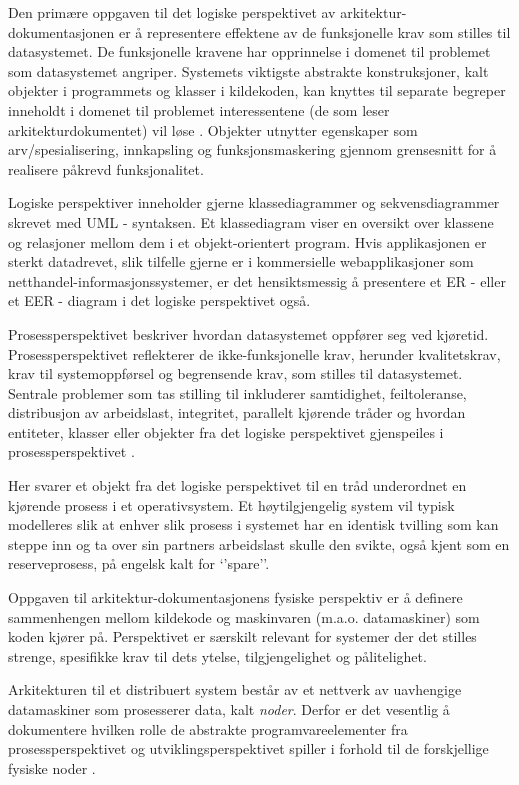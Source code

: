 Den primære oppgaven til det logiske perspektivet av arkitektur-dokumentasjonen er å representere effektene av de funksjonelle krav som stilles til datasystemet. De funksjonelle kravene har opprinnelse i domenet til problemet som datasystemet angriper. Systemets viktigste abstrakte konstruksjoner, kalt objekter i programmets og klasser i kildekoden, kan knyttes til separate begreper inneholdt i domenet til problemet interessentene (de som leser arkitekturdokumentet) vil løse \citep{kruchten1995}. Objekter utnytter egenskaper som arv/spesialisering, innkapsling og funksjonsmaskering gjennom grensesnitt for å realisere påkrevd funksjonalitet.

Logiske perspektiver inneholder gjerne klassediagrammer og sekvensdiagrammer skrevet med UML - syntaksen. Et klassediagram viser en oversikt over klassene og relasjoner mellom dem i et objekt-orientert program. Hvis applikasjonen er sterkt datadrevet, slik tilfelle gjerne er i kommersielle webapplikasjoner som netthandel-informasjonssystemer, er det hensiktsmessig å presentere et ER -  eller et EER - diagram i det logiske perspektivet også.

Prosessperspektivet beskriver hvordan datasystemet oppfører seg ved kjøretid. Prosessperspektivet reflekterer de ikke-funksjonelle krav, herunder kvalitetskrav, krav til systemoppførsel og begrensende krav, som stilles til datasystemet. Sentrale problemer som tas stilling til inkluderer samtidighet, feiltoleranse, distribusjon av arbeidslast, integritet, parallelt kjørende tråder og hvordan entiteter, klasser eller objekter fra det logiske perspektivet gjenspeiles i prosessperspektivet \citep{kruchten1995}.

Her svarer et objekt fra det logiske perspektivet til en tråd underordnet en kjørende prosess i et operativsystem. Et høytilgjengelig system vil typisk modelleres slik at enhver slik prosess i systemet har en identisk tvilling som kan steppe inn og ta over sin partners arbeidslast skulle den svikte, også kjent som en reserveprosess, på engelsk kalt for ‘’spare’’.

Oppgaven til arkitektur-dokumentasjonens fysiske perspektiv er å definere sammenhengen mellom kildekode og maskinvaren (m.a.o. datamaskiner) som koden kjører på. Perspektivet er særskilt relevant for systemer der det stilles strenge, spesifikke krav til dets ytelse, tilgjengelighet og pålitelighet.

Arkitekturen til et distribuert system består av et nettverk av uavhengige datamaskiner som prosesserer data, kalt \emph{noder}. Derfor er det vesentlig å dokumentere hvilken rolle de abstrakte programvareelementer fra prosessperspektivet og utviklingsperspektivet spiller i forhold til de forskjellige fysiske noder \citep{kruchten1995}.

